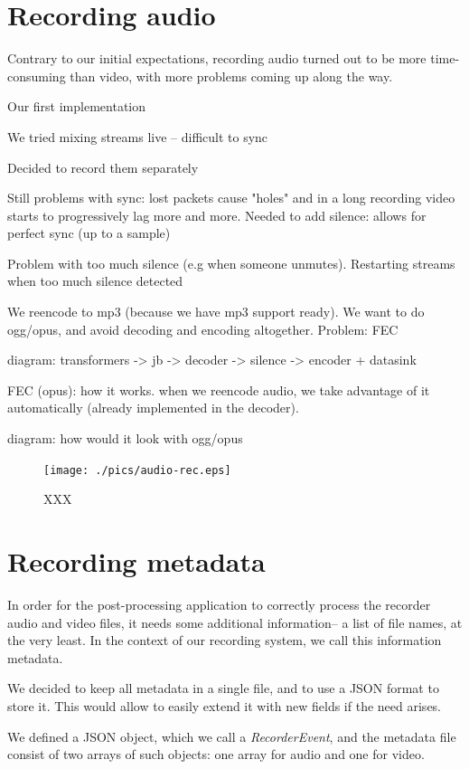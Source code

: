 \documentclass[twoside,openright,a4paper,12pt,english]{article}
\begin{document}
\section{Recording audio}
\label{recording-audio}
Contrary to our initial expectations, recording audio turned out to be more
time-consuming than video, with more problems coming up along the way.

Our first implementation 

We tried mixing streams live -- difficult to sync

Decided to record them separately

Still problems with sync: lost packets cause "holes" and in a long recording video starts to progressively lag more and more.
Needed to add silence: allows for perfect sync (up to a sample)

Problem with too much silence (e.g when someone unmutes). Restarting streams when too much silence detected

We reencode to mp3 (because we have mp3 support ready). We want to do ogg/opus, and avoid decoding and encoding altogether. Problem: FEC

diagram:
transformers -> jb -> decoder -> silence -> encoder + datasink

FEC (opus): how it works. when we reencode audio, we take advantage of it automatically (already implemented in the decoder).

diagram: how would it look with ogg/opus
\begin{figure}[h]
    \texttt{[image: ./pics/audio-rec.eps]}
    \label{diagram-sync}
    \caption{XXX}
\end{figure}




\section{Recording metadata}
\label{recording-metadata}
In order for the post-processing application to correctly process the recorder
audio and video files, it needs some additional information-- a list of file
names, at the very least. In the context of our recording system, we call this information
metadata.

We decided to keep all metadata in a single file, and to use a JSON
format to store it. This would allow to easily extend it with new fields if
the need arises.

We defined a JSON object, which we call a \emph{RecorderEvent}, and the
metadata file consist of two arrays of such objects: one array for audio and
one for video.
\end{document}
